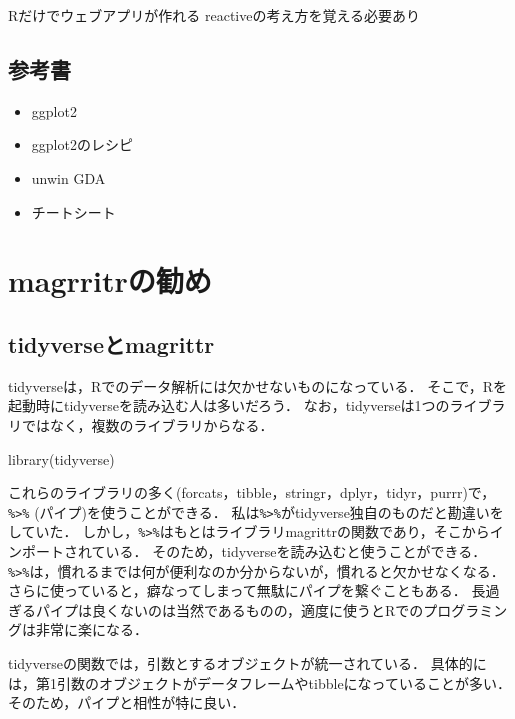 \documentclass[
]{article}
\newenvironment{Shaded}{\begin{snugshade}}{\end{snugshade}}
\newcommand{\FunctionTok}[1]{\textcolor[rgb]{0.00,0.00,0.00}{#1}}
\newcommand{\NormalTok}[1]{#1}
\providecommand{\tightlist}{%
  \setlength{\itemsep}{0pt}\setlength{\parskip}{0pt}}
\begin{document}
Rだけでウェブアプリが作れる
reactiveの考え方を覚える必要あり

\hypertarget{ux53c2ux8003ux66f8}{%
\subsection{参考書}\label{ux53c2ux8003ux66f8}}

\begin{itemize}
\tightlist
\item
  ggplot2
\item
  ggplot2のレシピ
\item
  unwin GDA
\item
  チートシート
\end{itemize}

\hypertarget{magrittr}{%
\section{magrritrの勧め}\label{magrittr}}

\hypertarget{tidyverseux3068magrittr}{%
\subsection{tidyverseとmagrittr}\label{tidyverseux3068magrittr}}

tidyverseは，Rでのデータ解析には欠かせないものになっている．
そこで，Rを起動時にtidyverseを読み込む人は多いだろう．
なお，tidyverseは1つのライブラリではなく，複数のライブラリからなる．

\begin{Shaded}
\begin{Highlighting}[]
\FunctionTok{library}\NormalTok{(tidyverse)}
\end{Highlighting}
\end{Shaded}

これらのライブラリの多く(forcats，tibble，stringr，dplyr，tidyr，purrr)で，\texttt{\%\textgreater{}\%} (パイプ)を使うことができる．
私は\texttt{\%\textgreater{}\%}がtidyverse独自のものだと勘違いをしていた．
しかし，\texttt{\%\textgreater{}\%}はもとはライブラリmagrittrの関数であり，そこからインポートされている．
そのため，tidyverseを読み込むと使うことができる．
\texttt{\%\textgreater{}\%}は，慣れるまでは何が便利なのか分からないが，慣れると欠かせなくなる．
さらに使っていると，癖なってしまって無駄にパイプを繋ぐこともある．
長過ぎるパイプは良くないのは当然であるものの，適度に使うとRでのプログラミングは非常に楽になる．

tidyverseの関数では，引数とするオブジェクトが統一されている．
具体的には，第1引数のオブジェクトがデータフレームやtibbleになっていることが多い．
そのため，パイプと相性が特に良い．
\end{document}

